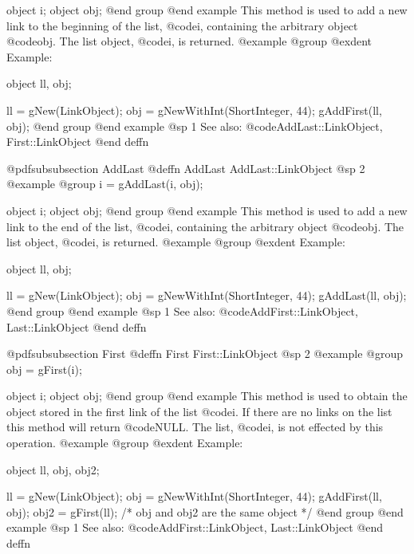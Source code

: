 object  i;
object  obj;
@end group
@end example
This method is used to add a new link to the beginning of the list,
@code{i}, containing the arbitrary object @code{obj}.  The list object,
@code{i}, is returned.
@example
@group
@exdent Example:

object  ll, obj;

ll = gNew(LinkObject);
obj = gNewWithInt(ShortInteger, 44);
gAddFirst(ll, obj);
@end group
@end example
@sp 1
See also:  @code{AddLast::LinkObject, First::LinkObject}
@end deffn







@pdfsubsubsection {AddLast}
@deffn {AddLast} AddLast::LinkObject
@sp 2
@example
@group
i = gAddLast(i, obj);

object  i;
object  obj;
@end group
@end example
This method is used to add a new link to the end of the list,
@code{i}, containing the arbitrary object @code{obj}.  The list object,
@code{i}, is returned.
@example
@group
@exdent Example:

object  ll, obj;

ll = gNew(LinkObject);
obj = gNewWithInt(ShortInteger, 44);
gAddLast(ll, obj);
@end group
@end example
@sp 1
See also:  @code{AddFirst::LinkObject, Last::LinkObject}
@end deffn











@pdfsubsubsection {First}
@deffn {First} First::LinkObject
@sp 2
@example
@group
obj = gFirst(i);

object  i;
object  obj;
@end group
@end example
This method is used to obtain the object stored in the first link of the
list @code{i}.  If there are no links on the list this method will
return @code{NULL}.  The list, @code{i}, is not effected by this operation.
@example
@group
@exdent Example:

object  ll, obj, obj2;

ll = gNew(LinkObject);
obj = gNewWithInt(ShortInteger, 44);
gAddFirst(ll, obj);
obj2 = gFirst(ll);
/* obj and obj2 are the same object  */
@end group
@end example
@sp 1
See also:  @code{AddFirst::LinkObject, Last::LinkObject}
@end deffn













